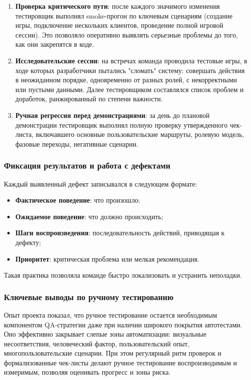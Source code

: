 \begin{enumerate}
    \item \textbf{Проверка критического пути}: после каждого значимого изменения тестировщик выполнял smoke-прогон по ключевым сценариям (создание игры, подключение нескольких клиентов, проведение полной игровой сессии). Это позволяло оперативно выявлять серьезные проблемы до того, как они закрепятся в коде.
    
    \item \textbf{Исследовательские сессии}: на встречах команда проводила тестовые игры, в ходе которых разработчики пытались "сломать" систему: совершать действия в неожиданном порядке, одновременно от разных ролей, с некорректными или пустыми данными. Далее тестировщиком составлялся список проблем и доработок, ранжированный по степени важности.
    
    \item \textbf{Ручная регрессия перед демонстрациями}: за день до плановой демонстрации тестировщик выполнял полную проверку утвержденного чек-листа, включавшего основные пользовательские маршруты, ролевую модель, фазовые переходы, негативные сценарии.
\end{enumerate}

\subsubsection{Фиксация результатов и работа с дефектами}

Каждый выявленный дефект записывался в следующем формате:

\begin{itemize}
    \item \textbf{Фактическое поведение}: что произошло;
    \item \textbf{Ожидаемое поведение}: что должно происходить;
    \item \textbf{Шаги воспроизведения}: последовательность действий, приводящая к дефекту;
    \item \textbf{Приоритет}: критическая проблема или мелкая рекомендация.
\end{itemize}

Такая практика позволяла команде быстро локализовать и устранить неполадки.

\subsubsection{Ключевые выводы по ручному тестированию}

Опыт проекта показал, что ручное тестирование остается необходимым компонентом QA-стратегии даже при наличии широкого покрытия автотестами. Оно эффективно закрывает слепые зоны автоматизации: визуальные несоответствия, человеческий фактор, пользовательский опыт, многопользовательские сценарии. При этом регулярный ритм проверок и формализованные чек-листы делают ручное тестирование воспроизводимым и измеримым, позволяя оценивать прогресс и зоны риска.
